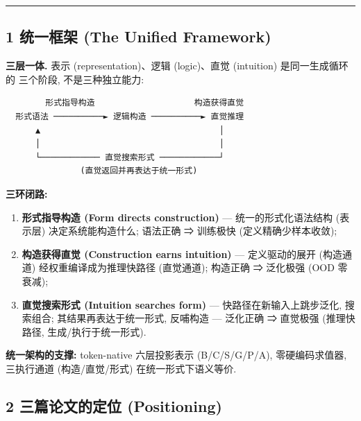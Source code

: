 \documentclass[
]{article}
\providecommand{\tightlist}{%
  \setlength{\itemsep}{0pt}\setlength{\parskip}{0pt}}
\begin{document}
\begin{center}\rule{0.5\linewidth}{0.5pt}\end{center}

\subsection{1 统一框架 (The Unified
Framework)}\label{ux7edfux4e00ux6846ux67b6-the-unified-framework}

\textbf{三层一体.} 表示 (representation)、逻辑 (logic)、直觉 (intuition)
是同一生成循环的 三个阶段, 不是三种独立能力:

\begin{verbatim}
        形式指导构造                    构造获得直觉
  形式语法 ──────────► 逻辑构造 ──────────► 直觉推理
      ▲                                    │
      │                                    │
      └──────────── 直觉搜索形式 ────────────┘
               (直觉返回并再表达于统一形式)
\end{verbatim}

\textbf{三环闭路:}

\begin{enumerate}
\def\labelenumi{\arabic{enumi}.}
\tightlist
\item
  \textbf{形式指导构造 (Form directs construction)} ---
  统一的形式化语法结构 (表示层) 决定系统能构造什么; 语法正确 ⇒ 训练极快
  (定义精确少样本收敛);
\item
  \textbf{构造获得直觉 (Construction earns intuition)} ---
  定义驱动的展开 (构造通道) 经权重编译成为推理快路径 (直觉通道);
  构造正确 ⇒ 泛化极强 (OOD 零衰减);
\item
  \textbf{直觉搜索形式 (Intuition searches form)} ---
  快路径在新输入上跳步泛化, 搜索组合; 其结果再表达于统一形式, 反哺构造
  --- 泛化正确 ⇒ 直觉极强 (推理快路径, 生成/执行于统一形式).
\end{enumerate}

\textbf{统一架构的支撑:} token-native 六层投影表示 (B/C/S/G/P/A),
零硬编码求值器, 三执行通道 (构造/直觉/形式) 在统一形式下语义等价.

\subsection{2 三篇论文的定位
(Positioning)}\label{ux4e09ux7bc7ux8bbaux6587ux7684ux5b9aux4f4d-positioning}
\end{document}
